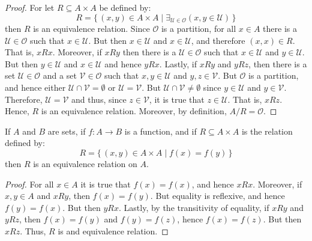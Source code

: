 \documentclass{article}                                                        %
\begin{document}
            \begin{proof}
                For let $R\subseteq{A}\times{A}$ be defined by:
                \begin{equation}
                    R=\{\,(x,y)\in{A}\times{A}\;|\;
                        \exists_{\mathcal{U}\in\mathcal{O}}
                        (x,y\in\mathcal{U})\,\}
                \end{equation}
                then $R$ is an equivalence relation. Since $\mathcal{O}$ is a
                partition, for all $x\in{A}$ there is a
                $\mathcal{U}\in\mathcal{O}$ such that $x\in\mathcal{U}$. But
                then $x\in\mathcal{U}$ and $x\in\mathcal{U}$, and therefore
                $(x,x)\in{R}$. That is, $xRx$. Moreover, if $xRy$ then there is
                a $\mathcal{U}\in\mathcal{O}$ such that $x\in\mathcal{U}$ and
                $y\in\mathcal{U}$. But then $y\in\mathcal{U}$ and
                $x\in\mathcal{U}$ and hence $yRx$. Lastly, if $xRy$ and $yRz$,
                then there is a set $\mathcal{U}\in\mathcal{O}$ and a set
                $\mathcal{V}\in\mathcal{O}$ such that $x,y\in\mathcal{U}$ and
                $y,z\in\mathcal{V}$. But $\mathcal{O}$ is a partition, and hence
                either $\mathcal{U}\cap\mathcal{V}=\emptyset$ or
                $\mathcal{U}=\mathcal{V}$. But
                $\mathcal{U}\cap\mathcal{V}\ne\emptyset$ since $y\in\mathcal{U}$
                and $y\in\mathcal{V}$. Therefore, $\mathcal{U}=\mathcal{V}$ and
                thus, since $z\in\mathcal{V}$, it is true that
                $z\in\mathcal{U}$. That is, $xRz$. Hence, $R$ is an equivalence
                relation. Moreover, by definition, $A/R=\mathcal{O}$.
            \end{proof}
            \begin{theorem}
                \label{thm:Fibers_of_Func_Form_Equiv_Relation}%
                If $A$ and $B$ are sets, if $f:A\rightarrow{B}$ is a function,
                and if $R\subseteq{A}\times{A}$ is the relation defined by:
                \begin{equation}
                    R=\{\,(x,y)\in{A}\times{A}\;|\;f(x)=f(y)\,\}
                \end{equation}
                then $R$ is an equivalence relation on $A$.
            \end{theorem}
            \begin{proof}
                For all $x\in{A}$ it is true that $f(x)=f(x)$, and hence $xRx$.
                Moreover, if $x,y\in{A}$ and $xRy$, then $f(x)=f(y)$. But
                equality is reflexive, and hence $f(y)=f(x)$. But then $yRx$.
                Lastly, by the transitivity of equality, if $xRy$ and $yRz$,
                then $f(x)=f(y)$ and $f(y)=f(z)$, hence $f(x)=f(z)$. But then
                $xRz$. Thus, $R$ is and equivalence relation.
            \end{proof}
\end{document}
